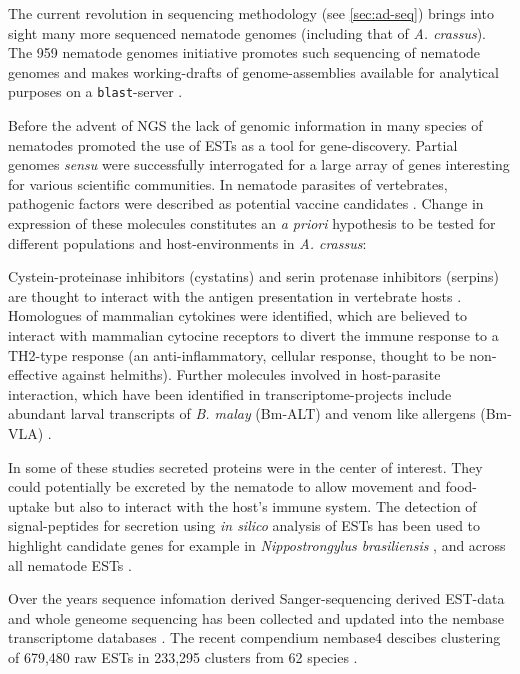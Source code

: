 The current revolution in sequencing methodology (see
\ref{sec:ad-seq}) brings into sight many more sequenced nematode
genomes (including that of \textit{A. crassus}). The 959 nematode
genomes initiative promotes such sequencing of nematode genomes and
makes working-drafts of genome-assemblies available for analytical
purposes on a \texttt{blast}-server \cite{pmid22058131} .

Before the advent of NGS the lack of genomic information in many
species of nematodes promoted the use of ESTs as a tool for
gene-discovery. Partial genomes \textit{sensu}
\cite{parkinson_partigene--constructing_2004} were successfully
interrogated for a large array of genes interesting for various
scientific communities. In nematode parasites of vertebrates,
pathogenic factors were described as potential vaccine candidates
\cite{pmid11406138}. Change in expression of these molecules
constitutes an \textit{a priori} hypothesis to be tested for different
populations and host-environments in \textit{A. crassus}:

Cystein-proteinase inhibitors (cystatins) and serin protenase
inhibitors (serpins) are thought to interact with the antigen
presentation in vertebrate hosts \cite{pmid11406138}. Homologues of
mammalian cytokines were identified, which are believed to interact
with mammalian cytocine receptors to divert the immune response to a
TH2-type response \cite{maizels_helminth_2004} (an anti-inflammatory,
cellular response, thought to be non-effective against
helmiths). Further molecules involved in host-parasite interaction,
which have been identified in transcriptome-projects include abundant
larval transcripts of \textit{B. malay} (Bm-ALT)
\cite{gomez-escobar_abundant_2002} and venom like allergens (Bm-VLA)
\cite{pmid11704277}.

In some of these studies secreted proteins were in the center of
interest. They could potentially be excreted by the nematode to allow
movement and food-uptake but also to interact with the host's immune
system. The detection of signal-peptides for secretion using
\textit{in silico} analysis of ESTs has been used to highlight
candidate genes for example in \textit{Nippostrongylus brasiliensis}
\cite{harcus_signal_2004}, and across all nematode ESTs
\cite{nagaraj_needles_2008}.

Over the years sequence infomation derived Sanger-sequencing derived
EST-data and whole geneome sequencing has been collected and updated
into the nembase transcriptome databases
\cite{parkinson_nembase:resource_2004,wasmuth_extent_2008}. The recent
compendium nembase4 descibes clustering of 679,480 raw ESTs in 233,295
clusters from 62 species \cite{pmid21550347}.

